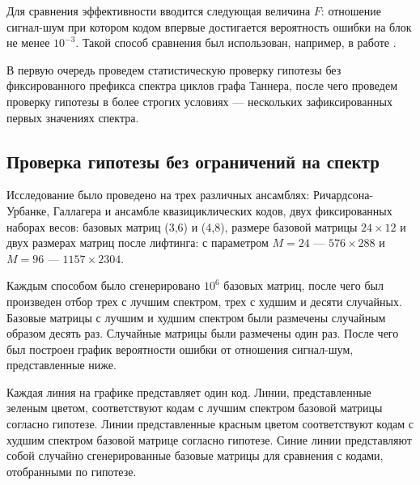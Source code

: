 Для сравнения эффективности вводится следующая величина $F$: отношение сигнал-шум при котором кодом
впервые достигается вероятность ошибки на блок не менее $10^{-3}$. Такой способ сравнения был использован,
например, в работе \cite{kudryashov-huawei}.

В первую очередь проведем статистическую проверку гипотезы без фиксированного префикса спектра циклов
графа Таннера, после чего проведем проверку гипотезы в более строгих условиях --- нескольких зафиксированных
первых значениях спектра.

\newcommand{\plotstandard}[2]{
\centerline{\texttt{[image: \#1]}}
\captionof{figure}{#2}
}

\newcommand{\plotsmall}[1]{\texttt{[image: \#1]}}

\subsection{Проверка гипотезы без ограничений на спектр}

Исследование было проведено на трех различных ансамблях: Ричардсона-Урбанке, Галлагера и ансамбле
квазициклических кодов, двух фиксированных наборах весов: базовых матриц (3,6) и (4,8), размере
базовой матрицы $24 \times 12$ и двух размерах матриц после лифтинга: с параметром $M=24$ --- $576 \times 288$
и $M=96$ --- $1157 \times 2304$.

Каждым способом было сгенерировано $10^6$ базовых матриц, после чего был произведен отбор трех с лучшим
спектром, трех с худшим и десяти случайных. Базовые матрицы с лучшим и худшим спектром были размечены
случайным образом десять раз. Случайные матрицы были размечены один раз. После чего был
построен график вероятности ошибки от отношения сигнал-шум, представленные ниже.

Каждая линия на графике представляет один код. Линии, представленные зеленым цветом, соответствуют
кодам с лучшим спектром базовой матрицы согласно гипотезе. Линии представленные красным цветом соответствуют кодам с
худшим спектром базовой матрице согласно гипотезе. Синие линии представляют собой случайно сгенерированные
базовые матрицы для сравнения с кодами, отобранными по гипотезе.


